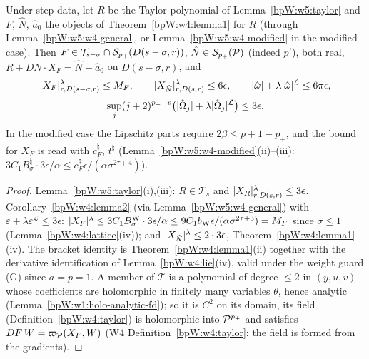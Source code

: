 \begin{lemma}\label{bpW:w5:solve}
Under step data, let $R$ be the Taylor polynomial of Lemma~\ref{bpW:w5:taylor} and $F$, $\hat N$, $\hat a_0$ the
objects of Theorem~\ref{bpW:w4:lemma1} for $R$ (through Lemma~\ref{bpW:w5:w4-general}, or Lemma~\ref{bpW:w5:w4-modified}
in the modified case). Then $F\in\mathcal T_{s-\sigma}\cap\mathcal S_{p_+}(D(s-\sigma,r))$, $\hat N\in\mathcal S_{p_+}(\mathcal P)$ (indeed
$p'$), both real, $R+DN\cdot X_F=\hat N+\hat a_0$ on $D(s-\sigma,r)$, and
\[\lvert X_F\rvert^\lambda_{r,D(s-\sigma,r)}\le M_F,\qquad\lvert X_{\hat N}\rvert^\lambda_{r,D(s,r)}\le6\epsilon,\qquad
\lvert \hat\omega\rvert+\lambda\lvert \hat\omega\rvert^{\mathcal L}\le6\pi\epsilon,\]
\[
\sup_j(j+2)^{p_+-p}\bigl(\lvert \hat\Omega_j\rvert+\lambda\lvert \hat\Omega_j\rvert^{\mathcal L}\bigr)\le3\epsilon.\]
In the modified case the Lipschitz parts require $2\beta\le p+1-p_+$, and the bound for $X_F$ is read with $c^\natural_F$,
$t^\natural$ (Lemma~\ref{bpW:w5:w4-modified}(ii)--(iii): $3C_1B^\natural_\sigma\cdot3\epsilon/\alpha\le c^\natural_F\epsilon/(\alpha\sigma^{2\tau+4})$).
\end{lemma}
\begin{proof}
\label{stepW:w5:s-in} Lemma~\ref{bpW:w5:taylor}(i),(iii): $R\in\mathcal T_s$ and
$\lvert X_R\rvert^\lambda_{r,D(s,r)}\le3\epsilon$.
\label{stepW:w5:s-out} Corollary~\ref{bpW:w4:lemma2} (via Lemma~\ref{bpW:w5:w4-general}) with
$\varepsilon+\lambda\varepsilon^{\mathcal L}\le3\epsilon$: $\lvert X_F\rvert^\lambda\le3C_1B^{\rm W}_\sigma\cdot3\epsilon/\alpha
\le9C_1b_{\rm W}\epsilon/(\alpha\sigma^{2\tau+3})=M_F$ since $\sigma\le1$ (Lemma~\ref{bpW:w4:lattice}(iv)); and
$\lvert X_{\hat N}\rvert^\lambda\le2\cdot3\epsilon$, Theorem~\ref{bpW:w4:lemma1}(iv). The bracket identity is
Theorem~\ref{bpW:w4:lemma1}(ii) together with the derivative identification of Lemma~\ref{bpW:w4:lie}(iv), valid under the
weight guard (G) since $a=p=1$.
\label{stepW:w5:s-class} A member of $\mathcal T$ is a polynomial of degree $\le2$ in $(y,u,v)$ whose
coefficients are holomorphic in finitely many variables $\theta$, hence analytic (Lemma~\ref{bpW:w1:holo-analytic-fd});
so it is $C^2$ on its domain, its field (Definition~\ref{bpW:w4:taylor}) is holomorphic into $\mathcal P^{p_+}$ and satisfies
$DF\,W=\varpi_{\mathcal P}(X_F,W)$ (W4 Definition~\ref{bpW:w4:taylor}: the field is formed from the gradients).
\end{proof}


